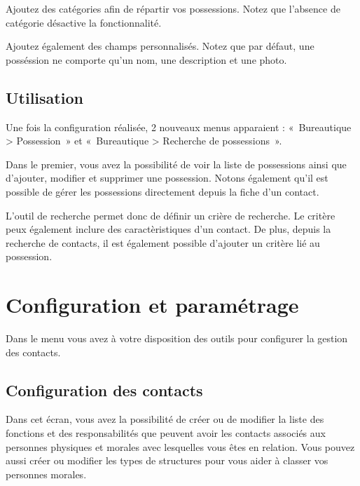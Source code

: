 \documentclass[letterpaper,10pt,french]{sphinxmanual}
\begin{document}
\sphinxAtStartPar
Ajoutez des catégories afin de répartir vos possessions.
Notez que l’absence de catégorie désactive la fonctionnalité.

\sphinxAtStartPar
Ajoutez également des champs personnalisés.
Notez que par défaut, une posséssion ne comporte qu’un nom, une description et une photo.


\subsection{Utilisation}
\label{\detokenize{contacts/possession:utilisation}}
\sphinxAtStartPar
Une fois la configuration réalisée, 2 nouveaux menus apparaient : « Bureautique \textgreater{} Possession » et « Bureautique \textgreater{} Recherche de possessions ».

\sphinxAtStartPar
Dans le premier, vous avez la possibilité de voir la liste de possessions ainsi que d’ajouter, modifier et supprimer une possession.
Notons également qu’il est possible de gérer les possessions directement depuis la fiche d’un contact.

\sphinxAtStartPar
L’outil de recherche permet donc de définir un crière de recherche. Le critère peux également inclure des caractèristiques d’un contact.
De plus, depuis la recherche de contacts, il est également possible d’ajouter un critère lié au possession.

\sphinxstepscope


\section{Configuration et paramétrage}
\label{\detokenize{contacts/configuration:configuration-et-parametrage}}\label{\detokenize{contacts/configuration::doc}}
\sphinxAtStartPar
Dans le menu  vous avez à votre disposition des outils pour configurer la gestion des contacts.


\subsection{Configuration des contacts}
\label{\detokenize{contacts/configuration:configuration-des-contacts}}
\sphinxAtStartPar
Dans cet écran, vous avez la possibilité de créer ou de modifier la liste des fonctions et des responsabilités que peuvent avoir les contacts  associés aux personnes physiques et morales avec lesquelles vous êtes en relation. Vous pouvez aussi créer ou modifier les types de structures pour vous aider à classer vos personnes morales.
\end{document}
